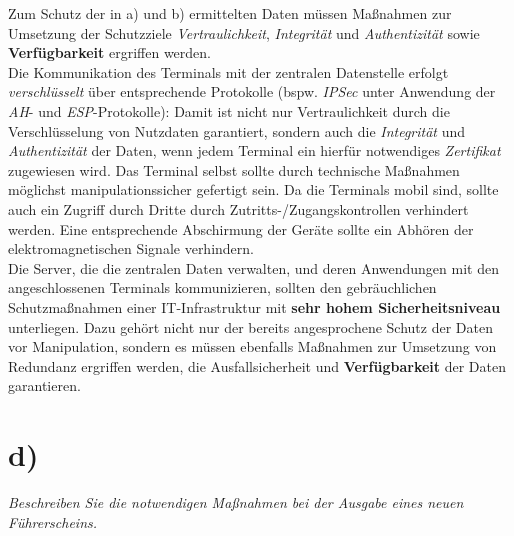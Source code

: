 \noindent
Zum Schutz der in a) und b) ermittelten Daten müssen Maßnahmen zur Umsetzung der Schutzziele \textit{Vertraulichkeit}, \textit{Integrität} und \textit{Authentizität} sowie \textbf{Verfügbarkeit} ergriffen werden.\\

\noindent
Die Kommunikation des Terminals mit der zentralen Datenstelle erfolgt \textit{verschlüsselt} über entsprechende Protokolle (bspw. \textit{IPSec} unter Anwendung der \textit{AH}- und \textit{ESP}-Protokolle): Damit ist nicht nur Vertraulichkeit durch die Verschlüsselung von Nutzdaten garantiert, sondern auch die \textit{Integrität} und \textit{Authentizität} der Daten, wenn jedem Terminal ein hierfür notwendiges \textit{Zertifikat} zugewiesen wird.
Das Terminal selbst sollte durch technische Maßnahmen möglichst manipulationssicher gefertigt sein.
Da die Terminals mobil sind, sollte auch ein Zugriff durch Dritte durch Zutritts-/Zugangskontrollen verhindert werden.
Eine entsprechende Abschirmung der Geräte sollte ein Abhören der elektromagnetischen Signale verhindern.\\

\noindent
Die Server, die die zentralen Daten verwalten, und deren Anwendungen mit den angeschlossenen Terminals kommunizieren, sollten den gebräuchlichen Schutzmaßnahmen einer IT-Infrastruktur mit \textbf{sehr hohem Sicherheitsniveau} unterliegen.
Dazu gehört nicht nur der bereits angesprochene Schutz der Daten vor Manipulation, sondern es müssen ebenfalls Maßnahmen zur Umsetzung von Redundanz ergriffen werden, die Ausfallsicherheit und \textbf{Verfügbarkeit} der Daten garantieren.

\section{d)}

\textit{Beschreiben Sie die notwendigen Maßnahmen bei der Ausgabe eines neuen Führerscheins.}

